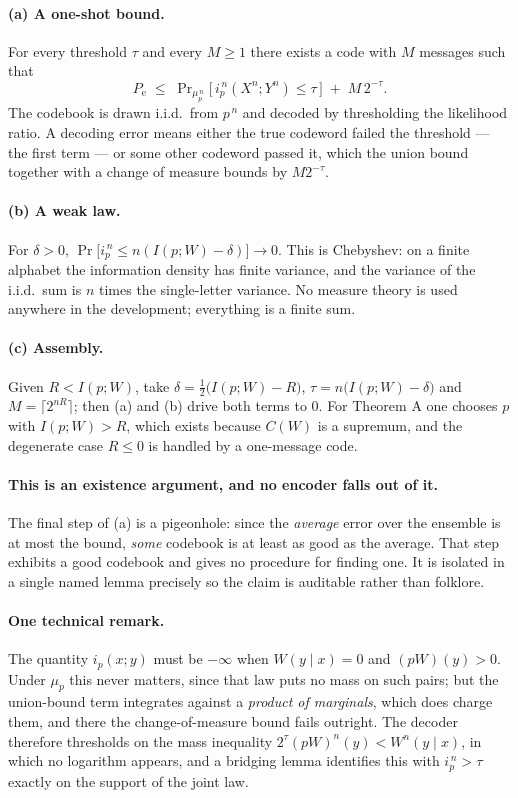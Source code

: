 \documentclass[11pt,a4paper]{article}
\newcommand{\Pe}{P_{\mathrm{e}}}
\begin{document}
\paragraph{(a) A one-shot bound.}
For every threshold $\tau$ and every $M\ge 1$ there exists a code with $M$
messages such that
\[
  \Pe \;\le\;
  \Pr\nolimits_{\mu_p^{\,n}}\bigl[\, i_p^{\,n}(X^{n};Y^{n}) \le \tau \,\bigr]
  \;+\; M\,2^{-\tau}.
\]
The codebook is drawn i.i.d.\ from $p^{\,n}$ and decoded by thresholding the
likelihood ratio. A decoding error means either the true codeword failed the
threshold --- the first term --- or some other codeword passed it, which the
union bound together with a change of measure bounds by $M2^{-\tau}$.

\paragraph{(b) A weak law.}
For $\delta>0$, $\Pr\bigl[i_p^{\,n} \le n(I(p;W)-\delta)\bigr]\to 0$. This is
Chebyshev: on a finite alphabet the information density has finite variance, and
the variance of the i.i.d.\ sum is $n$ times the single-letter variance. No
measure theory is used anywhere in the development; everything is a finite sum.

\paragraph{(c) Assembly.}
Given $R<I(p;W)$, take $\delta = \tfrac12\bigl(I(p;W)-R\bigr)$,
$\tau = n\bigl(I(p;W)-\delta\bigr)$ and $M = \lceil 2^{nR}\rceil$; then (a) and
(b) drive both terms to $0$. For Theorem A one chooses $p$ with $I(p;W)>R$, which
exists because $C(W)$ is a supremum, and the degenerate case $R\le 0$ is handled
by a one-message code.

\paragraph{This is an existence argument, and no encoder falls out of it.}
The final step of (a) is a pigeonhole: since the \emph{average} error over the
ensemble is at most the bound, \emph{some} codebook is at least as good as the
average. That step exhibits a good codebook and gives no procedure for finding
one. It is isolated in a single named lemma precisely so the claim is auditable
rather than folklore.

\paragraph{One technical remark.}
The quantity $i_p(x;y)$ must be $-\infty$ when $W(y\mid x)=0$ and $(pW)(y)>0$.
Under $\mu_p$ this never matters, since that law puts no mass on such pairs; but
the union-bound term integrates against a \emph{product of marginals}, which does
charge them, and there the change-of-measure bound fails outright. The decoder
therefore thresholds on the mass inequality
$2^{\tau}(pW)^{n}(y) < W^{n}(y\mid x)$, in which no logarithm appears, and a
bridging lemma identifies this with $i_p^{\,n}>\tau$ exactly on the support of
the joint law.
\end{document}
